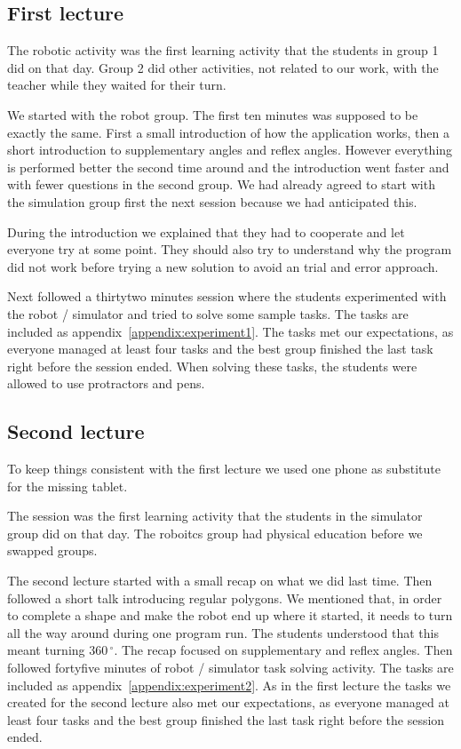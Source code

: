 \subsection*{First lecture}
The robotic activity was the first learning activity that the students in group 1 did on that day. 
Group 2 did other activities, not related to our work, with the teacher  while they waited for their turn.

\bigskip\noindent
We started with the robot group. The first ten minutes was supposed to be exactly the same. First a small introduction of how the application works, then a short introduction to supplementary angles and reflex angles. However everything is performed better the second time around and the introduction went faster and with fewer questions in the second group. We had already agreed to start with the simulation group first the next session because we had anticipated this.

\bigskip\noindent
During the introduction we explained that they had to cooperate and let everyone try at some point. They should also try to understand why the program did not work before trying a new solution to avoid an trial and error approach.

\bigskip\noindent
Next followed a thirtytwo minutes session where the students experimented with the robot / simulator and tried to solve some sample tasks. The tasks are included as appendix~\ref{appendix:experiment1}.
The tasks met our expectations, as everyone managed at least four tasks and the best group finished the last task right before the session ended. When solving these tasks, the students were allowed to use protractors and pens. 

\subsection*{Second lecture}
To keep things consistent with the first lecture we used one phone as substitute for the missing tablet.

\bigskip\noindent
The session was the first learning activity that the students in the simulator group did on that day. 
The roboitcs group had physical education before we swapped groups.

\bigskip\noindent
The second lecture started with a small recap on what we did last time. Then followed a short talk introducing regular polygons. We mentioned that, in order to complete a shape and make the robot end up where it started, it needs to turn all the way around during one program run. The students understood that this meant turning $360\,^{\circ}$. The recap focused on supplementary and reflex angles. Then followed fortyfive minutes of robot / simulator task solving activity. The tasks are included as appendix~\ref{appendix:experiment2}.
As in the first lecture the tasks we created for the second lecture also met our expectations, as everyone managed at least four tasks and the best group finished the last task right before the session ended. 